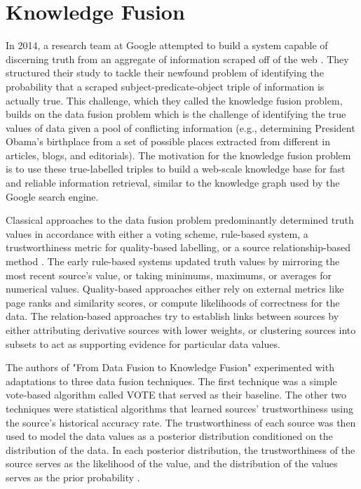 \section{Knowledge Fusion}

In 2014, a research team at Google attempted to build a system capable of discerning truth from an aggregate of information scraped off of the web \cite{knowledgeFusion}.  They structured their study to tackle their newfound problem of identifying the probability that a scraped subject-predicate-object triple of information is actually true.  This challenge, which they called the knowledge fusion problem, builds on the data fusion problem which is the challenge of identifying the true values of data given a pool of conflicting information (e.g., determining President Obama's birthplace from a set of possible places extracted from different in articles, blogs, and editorials).  The motivation for the knowledge fusion problem is to use these true-labelled triples to build a web-scale knowledge base for fast and reliable information retrieval, similar to the knowledge graph used by the Google search engine.

Classical approaches to the data fusion problem predominantly determined truth values in accordance with either a voting scheme, rule-based system, a trustworthiness metric for quality-based labelling, or a source relationship-based method \cite{trustworthiness}.  The early rule-based systems updated truth values by mirroring the most recent source's value, or taking minimums, maximums, or averages for numerical values.  Quality-based approaches either rely on external metrics like page ranks and similarity scores, or compute likelihoods of correctness for the data.  The relation-based approaches try to establish links between sources by either attributing derivative sources with lower weights, or clustering sources into subsets to act as supporting evidence for particular data values.

The authors of "From Data Fusion to Knowledge Fusion" \cite{knowledgeFusion} experimented with adaptations to three data fusion techniques.  The first technique was a simple vote-based algorithm called VOTE that served as their baseline.  The other two techniques were statistical algorithms that learned sources' trustworthiness using the source's historical accuracy rate.  The trustworthiness of each source was then used to model the data values as a posterior distribution conditioned on the distribution of the data.  In each posterior distribution, the trustworthiness of the source serves as the likelihood of the value, and the distribution of the values serves as the prior probability \cite{popaccu}.

